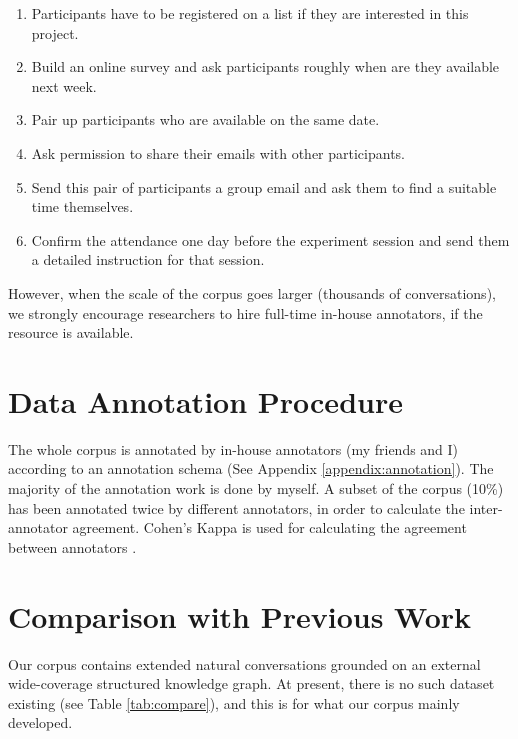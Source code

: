 \documentclass[bsc,frontabs,twoside,singlespacing,parskip,deptreport]{infthesis}     %
\begin{document}
\begin{enumerate}

    \item Participants have to be registered on a list if they are interested in this project.

   \item Build an online survey and ask participants roughly when are they available next week.

   \item Pair up participants who are available on the same date.
 
   \item Ask permission to share their emails with other participants.
   
    \item Send this pair of participants a group email and ask them to find a suitable time themselves.

    \item Confirm the attendance one day before the experiment session and send them a detailed instruction for that session.
    
\end{enumerate}

However, when the scale of the corpus goes larger (thousands of conversations), we strongly encourage researchers to hire full-time in-house annotators, if the resource is available.

\section{Data Annotation Procedure}

The whole corpus is annotated by in-house annotators (my friends and I) according to an annotation schema (See Appendix \ref{appendix:annotation}). The majority of the annotation work is done by myself. A subset of the corpus (10\%) has been annotated twice by different annotators, in order to calculate the inter-annotator agreement. Cohen's Kappa is used for calculating the agreement between annotators \cite{carletta1996assessing}.

\section{Comparison with Previous Work}

Our corpus contains extended natural conversations grounded on an external wide-coverage structured knowledge graph. At present, there is no such dataset existing (see Table \ref{tab:compare}), and this is for what our corpus mainly developed.
\end{document}
